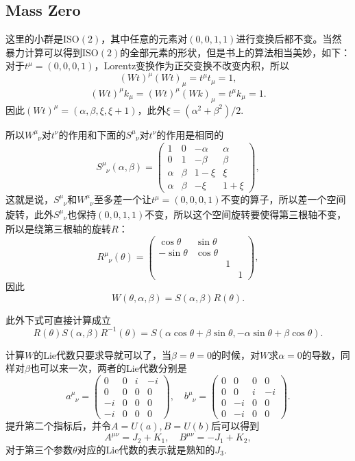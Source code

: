 \subsection*{Mass Zero}
这里的小群是$\mathrm{ISO}(2)$，其中任意的元素对$(0,0,1,1)$进行变换后都不变。当然暴力计算可以得到$\mathrm{ISO}(2)$的全部元素的形状，但是书上的算法相当美妙，如下：对于$t^\mu=(0,0,0,1)$，Lorentz变换作为正交变换不改变内积，所以
\[
(W t)^\mu (W t)_\mu=t^\mu t_\mu=1,
\]
\[
(W t)^\mu k_\mu=(W t)^\mu (W k)_\mu=t^\mu k_\mu=1.
\]
因此$(Wt)^\mu=(\alpha,\beta,\xi,\xi+1)$，此外$\xi=(\alpha^2+\beta^2)/2$.

所以$W^\mu_{\phantom{\mu}\nu}$对$t^\nu$的作用和下面的$S^\mu_{\phantom{\mu}\nu}$对$t^\nu$的作用是相同的
\[
S^\mu_{\phantom{\mu}\nu}(\alpha,\beta)=
\begin{pmatrix}
1&0&-\alpha&\alpha\\
0&1&-\beta&\beta\\
\alpha&\beta&1-\xi&\xi\\
\alpha&\beta&-\xi&1+\xi
\end{pmatrix},
\]
这就是说，$S^\mu_{\phantom{\mu}\nu}$和$W^\mu_{\phantom{\mu}\nu}$至多差一个让$t^\mu=(0,0,0,1)$不变的算子，所以差一个空间旋转，此外$S^\mu_{\phantom{\mu}\nu}$也保持$(0,0,1,1)$不变，所以这个空间旋转要使得第三根轴不变，所以是绕第三根轴的旋转$R$：
\[
R^\mu_{\phantom{\mu}\nu}(\theta)=
\begin{pmatrix}
\cos\theta&\sin\theta&&\\
-\sin\theta&\cos\theta&&\\
&&1&\\
&&&1
\end{pmatrix},
\]
因此
\[
W(\theta,\alpha,\beta)=S(\alpha,\beta)R(\theta).
\]

此外下式可直接计算成立
\[
R(\theta)S(\alpha,\beta)R^{-1}(\theta)=S(\alpha\cos\theta+\beta\sin\theta,-\alpha\sin\theta+\beta\cos\theta).
\]

计算$W$的Lie代数只要求导就可以了，当$\beta=\theta=0$的时候，对$W$求$\alpha=0$的导数，同样对$\beta$也可以来一次，两者的Lie代数分别是
\[a^\mu_{\phantom{\mu}\nu}=
\begin{pmatrix}
0&0&i&-i\\
0&0&0&0\\
-i&0&0&0\\
-i&0&0&0
\end{pmatrix},\quad
b^\mu_{\phantom{\mu}\nu}=
\begin{pmatrix}
0&0&0&0\\
0&0&i&-i\\
0&-i&0&0\\
0&-i&0&0
\end{pmatrix}.
\]
提升第二个指标后，并令$A=U(a),B=U(b)$后可以得到
\[
A^{\mu\nu}=J_2+K_1,\quad B^{\mu\nu}=-J_1+K_2,
\]
对于第三个参数$\theta$对应的Lie代数的表示就是熟知的$J_3$.

